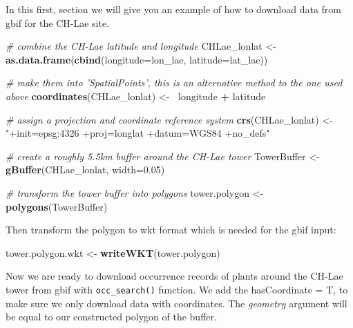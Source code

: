 \documentclass[
]{book}
\newenvironment{Shaded}{\begin{snugshade}}{\end{snugshade}}
\newcommand{\CommentTok}[1]{\textcolor[rgb]{0.56,0.35,0.01}{\textit{#1}}}
\newcommand{\DataTypeTok}[1]{\textcolor[rgb]{0.13,0.29,0.53}{#1}}
\newcommand{\DecValTok}[1]{\textcolor[rgb]{0.00,0.00,0.81}{#1}}
\newcommand{\ErrorTok}[1]{\textcolor[rgb]{0.64,0.00,0.00}{\textbf{#1}}}
\newcommand{\FloatTok}[1]{\textcolor[rgb]{0.00,0.00,0.81}{#1}}
\newcommand{\KeywordTok}[1]{\textcolor[rgb]{0.13,0.29,0.53}{\textbf{#1}}}
\newcommand{\NormalTok}[1]{#1}
\newcommand{\OperatorTok}[1]{\textcolor[rgb]{0.81,0.36,0.00}{\textbf{#1}}}
\newcommand{\StringTok}[1]{\textcolor[rgb]{0.31,0.60,0.02}{#1}}
\begin{document}
In this first, section we will give you an example of how to download data from gbif for the CH-Lae site.

\begin{Shaded}
\begin{Highlighting}[]
\CommentTok{# combine the CH-Lae latitude and longitude}
\NormalTok{CHLae_lonlat <-}\StringTok{ }\KeywordTok{as.data.frame}\NormalTok{(}\KeywordTok{cbind}\NormalTok{(}\DataTypeTok{longitude=}\NormalTok{lon_lae, }\DataTypeTok{latitude=}\NormalTok{lat_lae))}

\CommentTok{# make them into 'SpatialPoints', this is an alternative method to the one used above}
\KeywordTok{coordinates}\NormalTok{(CHLae_lonlat) <-}\StringTok{ }\ErrorTok{~}\NormalTok{longitude }\OperatorTok{+}\StringTok{ }\NormalTok{latitude}

\CommentTok{# assign a projection and coordinate reference system}
\KeywordTok{crs}\NormalTok{(CHLae_lonlat) <-}\StringTok{ "+init=epsg:4326 +proj=longlat +datum=WGS84 +no_defs"}

\CommentTok{# create a roughly 5.5km buffer around the CH-Lae tower}
\NormalTok{TowerBuffer <-}\StringTok{ }\KeywordTok{gBuffer}\NormalTok{(CHLae_lonlat, }\DataTypeTok{width=}\FloatTok{0.05}\NormalTok{)}

\CommentTok{# transform the tower buffer into polygons}
\NormalTok{tower.polygon <-}\StringTok{ }\KeywordTok{polygons}\NormalTok{(TowerBuffer)}
\end{Highlighting}
\end{Shaded}

Then transform the polygon to wkt format which is needed for the gbif input:

\begin{Shaded}
\begin{Highlighting}[]
\NormalTok{tower.polygon.wkt <-}\StringTok{ }\KeywordTok{writeWKT}\NormalTok{(tower.polygon)}
\end{Highlighting}
\end{Shaded}

Now we are ready to download occurrence records of plants around the CH-Lae tower from gbif with \texttt{occ\_search()} function.
We add the hasCoordinate = T, to make sure we only download data with coordinates.
The \emph{geometry} argument will be equal to our constructed polygon of the buffer.

\begin{Shaded}
\end{Shaded}
\end{document}
